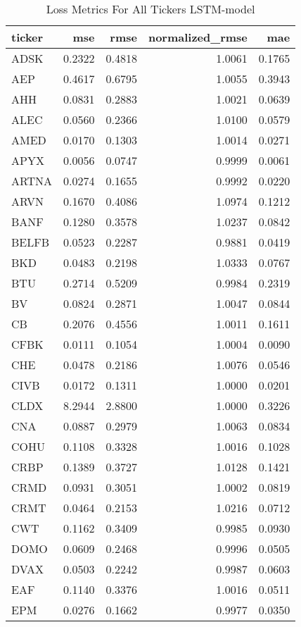 \begin{table}
\caption{Loss Metrics For All Tickers LSTM-model}
\label{tab:loss_total_lstm}
\begin{tabular}{lrrrr}
\toprule
ticker & mse & rmse & normalized_rmse & mae \\
\midrule
ADSK & 0.2322 & 0.4818 & 1.0061 & 0.1765 \\
AEP & 0.4617 & 0.6795 & 1.0055 & 0.3943 \\
AHH & 0.0831 & 0.2883 & 1.0021 & 0.0639 \\
ALEC & 0.0560 & 0.2366 & 1.0100 & 0.0579 \\
AMED & 0.0170 & 0.1303 & 1.0014 & 0.0271 \\
APYX & 0.0056 & 0.0747 & 0.9999 & 0.0061 \\
ARTNA & 0.0274 & 0.1655 & 0.9992 & 0.0220 \\
ARVN & 0.1670 & 0.4086 & 1.0974 & 0.1212 \\
BANF & 0.1280 & 0.3578 & 1.0237 & 0.0842 \\
BELFB & 0.0523 & 0.2287 & 0.9881 & 0.0419 \\
BKD & 0.0483 & 0.2198 & 1.0333 & 0.0767 \\
BTU & 0.2714 & 0.5209 & 0.9984 & 0.2319 \\
BV & 0.0824 & 0.2871 & 1.0047 & 0.0844 \\
CB & 0.2076 & 0.4556 & 1.0011 & 0.1611 \\
CFBK & 0.0111 & 0.1054 & 1.0004 & 0.0090 \\
CHE & 0.0478 & 0.2186 & 1.0076 & 0.0546 \\
CIVB & 0.0172 & 0.1311 & 1.0000 & 0.0201 \\
CLDX & 8.2944 & 2.8800 & 1.0000 & 0.3226 \\
CNA & 0.0887 & 0.2979 & 1.0063 & 0.0834 \\
COHU & 0.1108 & 0.3328 & 1.0016 & 0.1028 \\
CRBP & 0.1389 & 0.3727 & 1.0128 & 0.1421 \\
CRMD & 0.0931 & 0.3051 & 1.0002 & 0.0819 \\
CRMT & 0.0464 & 0.2153 & 1.0216 & 0.0712 \\
CWT & 0.1162 & 0.3409 & 0.9985 & 0.0930 \\
DOMO & 0.0609 & 0.2468 & 0.9996 & 0.0505 \\
DVAX & 0.0503 & 0.2242 & 0.9987 & 0.0603 \\
EAF & 0.1140 & 0.3376 & 1.0016 & 0.0511 \\
EPM & 0.0276 & 0.1662 & 0.9977 & 0.0350 \\

\end{tabular}
\end{table}
